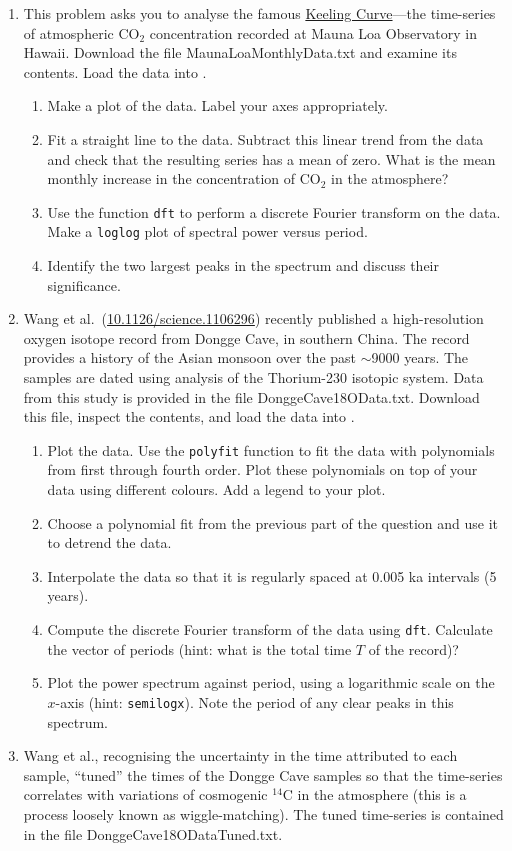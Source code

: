 \documentclass[12pt,twoside,a4paper]{article}
\begin{document}
\begin{enumerate}
\item This problem asks you to analyse the famous
  \href{http://en.wikipedia.org/wiki/Keeling_Curve} {Keeling
    Curve}---the time-series of atmospheric CO$_2$ concentration
  recorded at Mauna Loa Observatory in Hawaii. Download the file
  MaunaLoaMonthlyData.txt and examine its contents.  Load the data
  into \Mlab.
  \begin{enumerate}
  \item Make a plot of the data.  Label your axes appropriately.
  \item Fit a straight line to the data.  Subtract this linear trend
    from the data and check that the resulting series has a mean of
    zero.  What is the mean monthly increase in the concentration of
    CO$_2$ in the atmosphere?
  \item Use the function \texttt{dft} to perform a discrete Fourier
    transform on the data.  Make a \texttt{loglog} plot of spectral
    power versus period.
  \item Identify the two largest peaks in the spectrum and discuss
    their significance.
  \end{enumerate}
\item Wang et al.~(\href{http://dx.doi.org/10.1126/science.1106296}
  {10.1126/science.1106296}) recently published a high-resolution
  oxygen isotope record from Dongge Cave, in southern China.  The
  record provides a history of the Asian monsoon over the past
  $\sim$9000 years.  The samples are dated using analysis of the
  Thorium-230 isotopic system. Data from this study is provided in the
  file DonggeCave18OData.txt.  Download this file, inspect the
  contents, and load the data into \Mlab.
  \begin{enumerate}
  \item Plot the data. Use the \texttt{polyfit} function to fit the
    data with polynomials from first through fourth order.  Plot these
    polynomials on top of your data using different colours. Add a
    legend to your plot.
  \item Choose a polynomial fit from the previous part of the question
    and use it to detrend the data.
  \item Interpolate the data so that it is regularly spaced at 0.005
    ka intervals (5 years).
  \item Compute the discrete Fourier transform of the data using
    \texttt{dft}. Calculate the vector of periods (hint: what is the
    total time $T$ of the record)?
  \item Plot the power spectrum against period, using a logarithmic
    scale on the $x$-axis (hint: \texttt{semilogx}). Note the period
    of any clear peaks in this spectrum.
  \end{enumerate}
\item Wang et al., recognising the uncertainty in the time attributed
  to each sample, ``tuned'' the times of the Dongge Cave samples so
  that the time-series correlates with variations of cosmogenic
  $^{14}$C in the atmosphere (this is a process loosely known as
  wiggle-matching). The tuned time-series is contained in the file
  DonggeCave18ODataTuned.txt.


\end{enumerate}
\end{document}
